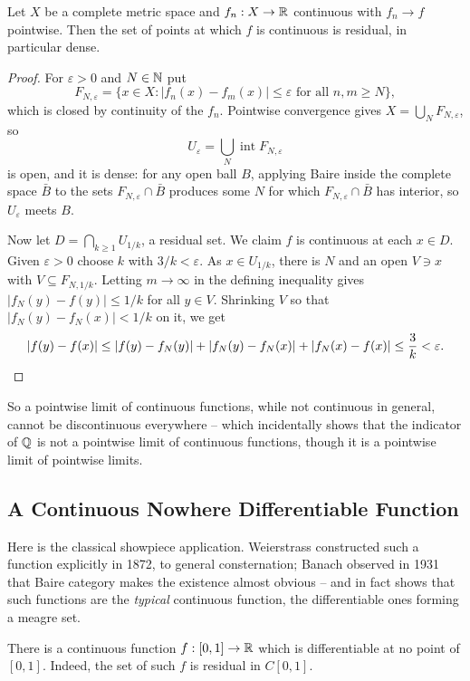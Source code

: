 \documentclass[a4paper]{scrartcl}
\begin{document}
\begin{theorem}[Osgood]
	Let $X$ be a complete metric space and $f_n : X \to \mathbb{R}$ continuous with $f_n \to f$ pointwise. Then the set of points at which $f$ is continuous is residual, in particular dense.
\end{theorem}

\begin{proof}
	For $\varepsilon>0$ and $N \in \mathbb{N}$ put
	$$F_{N,\varepsilon} = \{ x \in X : |f_n(x)-f_m(x)|\leq\varepsilon \text{ for all } n,m\geq N\},$$
	which is closed by continuity of the $f_n$. Pointwise convergence gives $X = \bigcup_N F_{N,\varepsilon}$, so
	$$U_\varepsilon = \bigcup_N \operatorname{int} F_{N,\varepsilon}$$
	is open, and it is dense: for any open ball $B$, applying Baire inside the complete space $\bar B$ to the sets $F_{N,\varepsilon}\cap\bar B$ produces some $N$ for which $F_{N,\varepsilon}\cap\bar B$ has interior, so $U_\varepsilon$ meets $B$.

	Now let $D = \bigcap_{k\geq1}U_{1/k}$, a residual set. We claim $f$ is continuous at each $x \in D$. Given $\varepsilon>0$ choose $k$ with $3/k<\varepsilon$. As $x \in U_{1/k}$, there is $N$ and an open $V \ni x$ with $V \subseteq F_{N,1/k}$. Letting $m \to\infty$ in the defining inequality gives $|f_N(y)-f(y)|\leq 1/k$ for all $y \in V$. Shrinking $V$ so that $|f_N(y)-f_N(x)|<1/k$ on it, we get
	$$|f(y)-f(x)| \leq |f(y)-f_N(y)|+|f_N(y)-f_N(x)|+|f_N(x)-f(x)| \leq \frac{3}{k}<\varepsilon. \qedhere$$
\end{proof}

So a pointwise limit of continuous functions, while not continuous in general, cannot be discontinuous everywhere -- which incidentally shows that the indicator of $\mathbb{Q}$ is not a pointwise limit of continuous functions, though it is a pointwise limit of pointwise limits.

\subsection{A Continuous Nowhere Differentiable Function}

Here is the classical showpiece application. Weierstrass constructed such a function explicitly in 1872, to general consternation; Banach observed in 1931 that Baire category makes the existence almost obvious -- and in fact shows that such functions are the \emph{typical} continuous function, the differentiable ones forming a meagre set.

\begin{theorem}
	There is a continuous function $f : [0,1] \to \mathbb{R}$ which is differentiable at no point of $[0,1]$. Indeed, the set of such $f$ is residual in $C[0,1]$.
\end{theorem}
\end{document}
